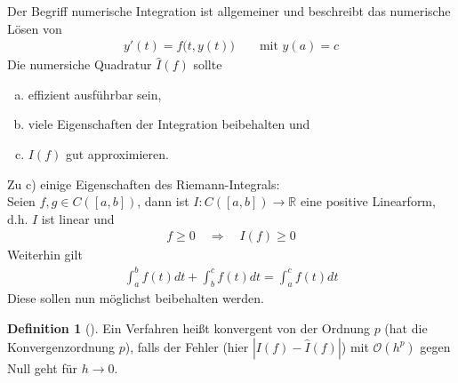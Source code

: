 \documentclass[ngerman,fontsize=11pt, paper=a4, parskip=half, titlepage=true, toc=bib]{scrbook}
\theoremstyle{definition}
\newtheorem{Def}{Definition}[section]		%
\theoremstyle{plain}
\newcommand{\R}{\mathds{R}}
\newenvironment{Defe}[1][]{ %
  \begin{Def}[#1]}
  {\end{Def}
  \addtocounter{subsection}{1}}
\begin{document}
Der Begriff numerische Integration ist allgemeiner und
beschreibt das numerische Lösen von
\begin{gather*}
  y'(t) = f\big(t,y(t)\big) \qquad \text{mit } y(a)=c
\end{gather*}
Die numersiche Quadratur $\hat{I}(f)$ sollte
\begin{enumerate}[a)]
\item effizient ausführbar sein,
\item viele Eigenschaften der Integration beibehalten und
\item $I(f)$ gut approximieren.
\end{enumerate}
Zu c) einige Eigenschaften des Riemann-Integrals:\\
Seien $f,g\in C([a,b])$, dann ist $I:C([a,b])\longrightarrow\R$
eine positive Linearform, d.h. $I$ ist linear und 
\begin{gather}
  f\geq 0 \quad \Rightarrow \quad I(f)\geq 0
  \label{VII.1.1}
\end{gather}
Weiterhin gilt
\begin{gather}
  \int_a^b f(t)dt + \int_b^c f(t)dt = \int_a^cf(t)dt
  \label{VII.1.2}
\end{gather}
Diese sollen nun möglichst beibehalten werden.

\begin{Defe}\label{7.1.1}
  Ein Verfahren heißt konvergent von der Ordnung $p$
  (hat die Konvergenzordnung $p$),
  falls der Fehler (hier $|I(f)-\hat{I}(f)|$)
  mit $\mathcal{O}(h^p)$ gegen Null geht für $h\longrightarrow 0$.
\end{Defe}
\end{document}
